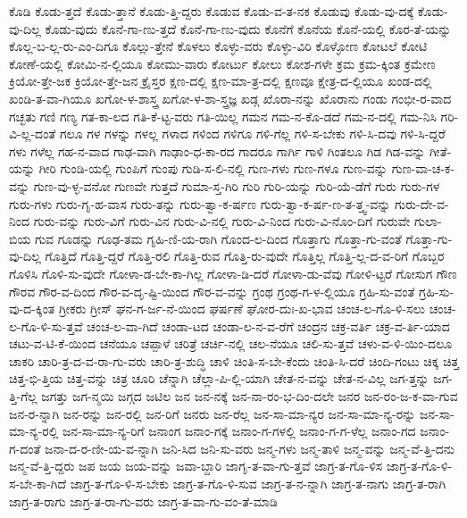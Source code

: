 {ಕೊಡಿ
ಕೊಡು-ತ್ತದೆ
ಕೊಡು-ತ್ತಾನೆ
ಕೊಡು-ತ್ತಿ-ದ್ದರು
ಕೊಡುವ
ಕೊಡು-ವ-ತ-ನಕ
ಕೊಡುವು
ಕೊಡು-ವು-ದಕ್ಕೆ
ಕೊಡು-ವು-ದಿಲ್ಲ
ಕೊಡು-ವುದು
ಕೊನೆ-ಗಾ-ಣು-ತ್ತದೆ
ಕೊನೆ-ಗಾ-ಣು-ವುದು
ಕೊನೆಗೆ
ಕೊನೆಯ
ಕೊನೆ-ಯಲ್ಲಿ
ಕೊರ-ತೆ-ಯನ್ನು
ಕೊಲ್ಲ-ಬ-ಲ್ಲ-ರು-ಎಂ-ದಿಗೂ
ಕೊಲ್ಲು-ತ್ತೇನೆ
ಕೊಳಲು
ಕೊಳ್ಳು-ವರು
ಕೊಳ್ಳು-ವಿರಿ
ಕೊಳ್ಳೋಣ
ಕೋಟಲೆ
ಕೋಟಿ
ಕೋಣೆ-ಯಲ್ಲಿ
ಕೋಮಿ-ನ-ಲ್ಲಿಯೂ
ಕೋಮು-ವಾರು
ಕೋರ್ಟು
ಕೋಲು
ಕೋಶ-ಗಳೇ
ಕ್ರಮ
ಕ್ರಮ-ಕ್ಕಿಂತ
ಕ್ರಮೇಣ
ಕ್ರಿಯೋ-ತ್ತೇ-ಜಕ
ಕ್ರಿಯೋ-ತ್ತೇ-ಜನ
ಕ್ರೈಸ್ತರ
ಕ್ಷಣ-ದಲ್ಲಿ
ಕ್ಷಣ-ಮಾ-ತ್ರ-ದಲ್ಲಿ
ಕ್ಷಣವೂ
ಕ್ಷೇತ್ರ-ದ-ಲ್ಲಿಯೂ
ಖಂಡ-ದಲ್ಲಿ
ಖಂಡಿ-ತ-ವಾ-ಗಿಯೂ
ಖಗೋ-ಳ-ಶಾಸ್ತ್ರ
ಖಗೋ-ಳ-ಶಾ-ಸ್ತ್ರಜ್ಞ
ಖಡ್ಗ
ಖೊರಾ-ನನ್ನು
ಖೊರಾನು
ಗಂಡು
ಗಂಭೀ-ರ-ವಾದ
ಗಚ್ಛತು
ಗಣಿ
ಗಣ್ಯ
ಗತ-ಕಾ-ಲದ
ಗತಿ-ಕೆ-ಟ್ಟ-ವರು
ಗತಿ-ಯಿಲ್ಲ
ಗಮನ
ಗಮ-ನ-ಕೊ-ಡದೆ
ಗಮ-ನ-ದಲ್ಲಿ
ಗಮ-ನಿಸಿ
ಗರಿ-ವಿ-ಲ್ಲ-ದಂತೆ
ಗಲೂ
ಗಳ
ಗಳನ್ನು
ಗಳಲ್ಲ
ಗಳಾದ
ಗಳಿಂದ
ಗಳಿಗೂ
ಗಳಿ-ಗೆಲ್ಲ
ಗಳಿ-ಸ-ಬೇಕು
ಗಳಿ-ಸಿ-ದವು
ಗಳಿ-ಸಿ-ದ್ದರೆ
ಗಳು
ಗಳೆಲ್ಲ
ಗಹ-ನ-ವಾದ
ಗಾಢ-ವಾಗಿ
ಗಾಢಾಂ-ಧ-ಕಾ-ರದ
ಗಾದರೂ
ಗಾರ್ಗಿ
ಗಾಳಿ
ಗಿಂತಲೂ
ಗಿಡ
ಗಿಡ-ವನ್ನು
ಗೀತೆ-ಯನ್ನು
ಗೀರಿ
ಗುಂಡಿ-ಯಲ್ಲಿ
ಗುಂಪಿಗೆ
ಗುಂಪು
ಗುಡಿ-ಸ-ಲಿ-ನಲ್ಲಿ
ಗುಣ-ಗಳು
ಗುಣ-ಗಳೂ
ಗುಣ-ವನ್ನು
ಗುಣ-ವಾ-ಚ-ಕ-ವನ್ನು
ಗುಣ-ವು-ಳ್ಳ-ವನೋ
ಗುಣವೇ
ಗುತ್ತದೆ
ಗುಮಾ-ಸ್ತ-ಗಿರಿ
ಗುರಿ
ಗುರಿ-ಯನ್ನು
ಗುರಿ-ಯೆ-ಡೆಗೆ
ಗುರು
ಗುರು-ಗಳ
ಗುರು-ಗಳು
ಗುರು-ಗೃ-ಹ-ವಾಸ
ಗುರು-ತನ್ನು
ಗುರು-ತ್ವಾ-ಕ-ರ್ಷಣ
ಗುರು-ತ್ವಾ-ಕ-ರ್ಷ-ಣ-ತ-ತ್ತ್ವ-ವನ್ನು
ಗುರು-ದೇ-ವ-ನಿಂದ
ಗುರು-ವನ್ನು
ಗುರು-ವಿಗೆ
ಗುರು-ವಿನ
ಗುರು-ವಿ-ನಲ್ಲಿ
ಗುರು-ವಿ-ನಿಂದ
ಗುರು-ವಿ-ನೊಂ-ದಿಗೆ
ಗುರುವೇ
ಗುಲಾ-ಬಿಯ
ಗುವ
ಗೂಡನ್ನು
ಗೂಢ-ತಮ
ಗೃಹಿ-ಣಿ-ಯ-ರಾಗಿ
ಗೊಂದ-ಲ-ದಿಂದ
ಗೊತ್ತಾಗು
ಗೊತ್ತಾ-ಗು-ವಂತೆ
ಗೊತ್ತಾ-ಗು-ವು-ದಿಲ್ಲ
ಗೊತ್ತಿದೆ
ಗೊತ್ತಿ-ದ್ದರೆ
ಗೊತ್ತಿ-ರಲಿ
ಗೊತ್ತಿ-ರುವ
ಗೊತ್ತಿ-ರು-ವುದೇ
ಗೊತ್ತಿಲ್ಲ
ಗೊತ್ತಿ-ಲ್ಲ-ದ-ವ-ರಿಗೆ
ಗೊಬ್ಬರ
ಗೊಳಿಸಿ
ಗೊಳಿ-ಸು-ವುದೇ
ಗೋಳಾ-ಡ-ಬೇ-ಕಾ-ಗಿಲ್ಲ
ಗೋಳಾ-ಡಿ-ದರೆ
ಗೋಳಾ-ಡು-ವೆವು
ಗೋಳಿ-ಟ್ಟರೆ
ಗೋಸುಗ
ಗೌಣ
ಗೌರವ
ಗೌರ-ವ-ದಿಂದ
ಗೌರ-ವ-ದೃ-ಷ್ಟಿ-ಯಿಂದ
ಗೌರ-ವ-ವನ್ನು
ಗ್ರಂಥ
ಗ್ರಂಥ-ಗ-ಳ-ಲ್ಲಿಯೂ
ಗ್ರಹಿ-ಸು-ವಂತೆ
ಗ್ರಹಿ-ಸು-ವು-ದ-ಕ್ಕಿಂತ
ಗ್ರೀಕರು
ಗ್ರೀಸ್
ಘನ-ಗ-ರ್ಜ-ನೆ-ಯಿಂದ
ಘರ್ಷಣೆ
ಘೋರ-ದುಃ-ಖ-ಭಾವ
ಚಂಚ-ಲ-ಗೊ-ಳಿ-ಸಲು
ಚಂಚ-ಲ-ಗೊ-ಳಿ-ಸು-ತ್ತವೆ
ಚಂಚ-ಲ-ವಾ-ಗಿದೆ
ಚಂಡಾ-ಟದ
ಚಂಡಾ-ಲ-ನ-ವ-ರೆಗೆ
ಚಂದ್ರನ
ಚಕ್ರ-ವರ್ತಿ
ಚಕ್ರ-ವ-ರ್ತಿ-ಯಾದ
ಚಟು-ವ-ಟಿ-ಕೆ-ಯಿಂದ
ಚನೆಯೂ
ಚಪ್ಪಾಳೆ
ಚರಿತ್ರೆ
ಚರ್ಚಿ-ನಲ್ಲಿ
ಚಲ-ನೆಯೂ
ಚಲಿ-ಸು-ತ್ತವೆ
ಚಳು-ವ-ಳಿ-ಯಿಂ-ದಲೂ
ಚಾಕರಿ
ಚಾರಿ-ತ್ರ-ದ-ವ-ರಾ-ಗು-ವರು
ಚಾರಿ-ತ್ರ-ಶುದ್ಧಿ
ಚಾಳಿ
ಚಿಂತಿ-ಸ-ಬೇ-ಕೆಂದು
ಚಿಂತಿ-ಸಿ-ದರೆ
ಚಿಂದಿ-ಗಂಟು
ಚಿಕ್ಕ
ಚಿತ್ತ
ಚಿತ್ತ-ಭಿ-ತ್ತಿಯ
ಚಿತ್ತ-ವನ್ನು
ಚಿತ್ರ
ಚೂರಿ
ಚೆನ್ನಾಗಿ
ಚೆಲ್ಲಾ-ಪಿ-ಲ್ಲಿ-ಯಾಗಿ
ಚೇತ-ನ-ವನ್ನು
ಚೇತ-ನ-ವಿಲ್ಲ
ಜಗ-ತ್ತನ್ನು
ಜಗ-ತ್ತಿ-ಗೆಲ್ಲ
ಜಗತ್ತು
ಜಗ-ನ್ಮಯಿ
ಜಗ್ಗದ
ಜಟಿಲ
ಜನ
ಜನ-ನಕ್ಕೆ
ಜನ-ನಾ-ರಂ-ಭ-ದಿಂ-ದಲೇ
ಜನರ
ಜನ-ರಂ-ಜ-ಕ-ವಾ-ಗುವ
ಜನ-ರ-ನ್ನಾಗಿ
ಜನ-ರನ್ನು
ಜನ-ರಲ್ಲಿ
ಜನ-ರಿಗೆ
ಜನರು
ಜನ-ರೆಲ್ಲ
ಜನ-ಸಾ-ಮಾ-ನ್ಯರ
ಜನ-ಸಾ-ಮಾ-ನ್ಯ-ರನ್ನು
ಜನ-ಸಾ-ಮಾ-ನ್ಯ-ರಲ್ಲಿ
ಜನ-ಸಾ-ಮಾ-ನ್ಯ-ರಿಗೆ
ಜನಾಂಗ
ಜನಾಂ-ಗಕ್ಕೆ
ಜನಾಂ-ಗ-ಗಳಲ್ಲಿ
ಜನಾಂ-ಗ-ಗ-ಳೆಲ್ಲ
ಜನಾಂ-ಗದ
ಜನಾಂ-ಗ-ದಂತೆ
ಜನಾ-ದ-ರ-ಣೀ-ಯ-ವ-ನ್ನಾಗಿ
ಜನಿ-ಸಿದ
ಜನಿ-ಸು-ವರು
ಜನ್ಮ-ಗಳು
ಜನ್ಮ-ತಾಳಿ
ಜನ್ಮ-ವನ್ನು
ಜನ್ಮ-ವೆ-ತ್ತಿ-ದನು
ಜನ್ಮ-ವೆ-ತ್ತಿ-ದ್ದರು
ಜಪ
ಜಯ
ಜಯ-ವನ್ನು
ಜವಾ-ಬ್ದಾರಿ
ಜಾಗೃ-ತ-ವಾ-ಗು-ತ್ತವೆ
ಜಾಗ್ರ-ತ-ಗೊ-ಳಿಸ
ಜಾಗ್ರ-ತ-ಗೊ-ಳಿ-ಸ-ಬೇ-ಕಾ-ಗಿದೆ
ಜಾಗ್ರ-ತ-ಗೊ-ಳಿ-ಸ-ಬೇಕು
ಜಾಗ್ರ-ತ-ಗೊ-ಳಿ-ಸುವ
ಜಾಗ್ರ-ತ-ನ-ನ್ನಾಗಿ
ಜಾಗ್ರ-ತ-ನಾಗು
ಜಾಗ್ರ-ತ-ರಾಗಿ
ಜಾಗ್ರ-ತ-ರಾಗು
ಜಾಗ್ರ-ತ-ರಾ-ಗು-ವರು
ಜಾಗ್ರ-ತ-ವಾ-ಗು-ವಂ-ತೆ-ಮಾಡಿ
}
